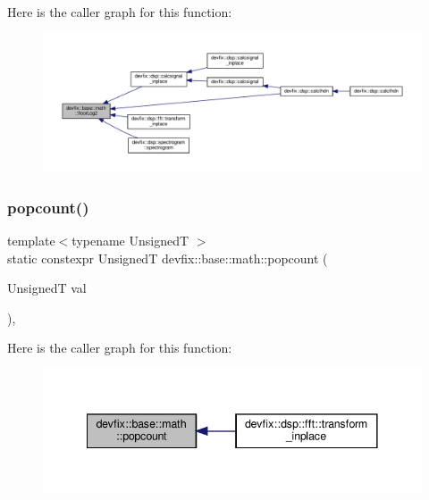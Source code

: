 Here is the caller graph for this function\+:
\nopagebreak
\begin{figure}[H]
\begin{center}
\leavevmode
\includegraphics[width=350pt]{structdevfix_1_1base_1_1math_a3ea732698f7ebf65df433de95721a6c1_icgraph}
\end{center}
\end{figure}
\mbox{\label{structdevfix_1_1base_1_1math_ac3c5661a2ec82e7ae00e899c2a3d2049}} 
\subsubsection{\texorpdfstring{popcount()}{popcount()}}
{\footnotesize\ttfamily template$<$typename UnsignedT $>$ \\
static constexpr UnsignedT devfix\+::base\+::math\+::popcount (\begin{DoxyParamCaption}\item[{UnsignedT}]{val }\end{DoxyParamCaption})\hspace{0.3cm}{\ttfamily [inline]}, {\ttfamily [static]}}

Here is the caller graph for this function\+:
\nopagebreak
\begin{figure}[H]
\begin{center}
\leavevmode
\includegraphics[width=341pt]{structdevfix_1_1base_1_1math_ac3c5661a2ec82e7ae00e899c2a3d2049_icgraph}
\end{center}
\end{figure}
\mbox{\label{structdevfix_1_1base_1_1math_af3260ac1a62b3e9f6feb0f212aa8f796}} 
